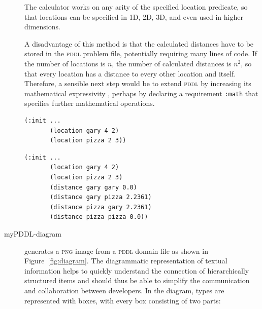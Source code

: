 \documentclass[runningheads]{llncs}
\newcommand{\mypddl}{\textsc{myPddl}\xspace}
\newcommand{\pddl}{\textsc{pddl}\xspace}
\begin{document}
\begin{description}
The calculator works on any arity of the specified location predicate,
so that locations can be specified in 1D, 2D, 3D, and even used in
higher dimensions.

A disadvantage of this method is that the calculated distances have to
be stored in the \pddl problem file, potentially requiring many lines
of code. If the number of locations is \(n\), the number of calculated
distances is \(n^2\), so that every location has a distance to every
other location and itself. Therefore, a sensible next step would be
to extend \pddl by increasing its mathematical expressivity
\cite{parkinson2012increasing}, perhaps by declaring a requirement
\texttt{:math} that specifies further mathematical operations.

\begin{listing}[H]
\begin{verbatim}
(:init ...
       (location gary 4 2)
       (location pizza 2 3))
\end{verbatim}
\caption[Excerpt of the extended problem file before using
\mypddl-distance]{\label{ls:before-mypddl-distance}Excerpt of the
  \texttt{(:init~...)} block of the extended file \emph{Gary's Huge
    Problem} before using \mypddl-distance.}
\end{listing}

\begin{listing}[H]
\begin{verbatim}
(:init ...
       (location gary 4 2)
       (location pizza 2 3)
       (distance gary gary 0.0)
       (distance gary pizza 2.2361)
       (distance pizza gary 2.2361)
       (distance pizza pizza 0.0))
\end{verbatim}
\caption[Excerpt of the extended problem file after using
\mypddl-distance]{\label{ls:after-mypddl-distance}After the
  application of \mypddl-distance, the calculated distances are
  inserted in the \texttt{(:init ...)} code block in a copy of the
  problem file.}
\end{listing}


\item[myPDDL-diagram] generates a \textsc{png} image from a \pddl
  domain file as shown in Figure~\ref{fig:diagram}. The diagrammatic
  representation of textual information helps to quickly understand
  the connection of hierarchically structured items and should thus be
  able to simplify the communication and collaboration between
  developers. In the diagram, types are represented with boxes, with
  every box consisting of two parts:


\end{description}
\end{document}
